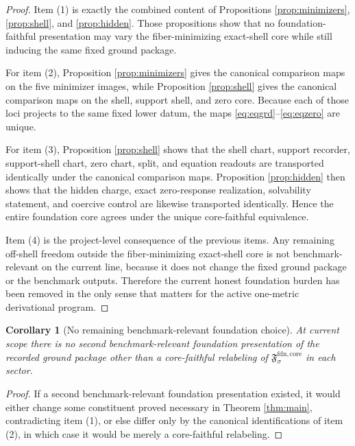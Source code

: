 \documentclass[11pt]{article}
\newcommand{\FoundCore}[1]{\mathfrak F_{#1}^{\mathrm{fdn,core}}}
\newtheorem{corollary}{Corollary}
\begin{document}
\begin{proof}
Item (1) is exactly the combined content of Propositions \ref{prop:minimizers}, \ref{prop:shell}, and \ref{prop:hidden}. Those propositions show that no foundation-faithful presentation may vary the fiber-minimizing exact-shell core while still inducing the same fixed ground package.

For item (2), Proposition \ref{prop:minimizers} gives the canonical comparison maps on the five minimizer images, while Proposition \ref{prop:shell} gives the canonical comparison maps on the shell, support shell, and zero core. Because each of those loci projects to the same fixed lower datum, the maps \eqref{eq:eqgrd}--\eqref{eq:eqzero} are unique.

For item (3), Proposition \ref{prop:shell} shows that the shell chart, support recorder, support-shell chart, zero chart, split, and equation readouts are transported identically under the canonical comparison maps. Proposition \ref{prop:hidden} then shows that the hidden charge, exact zero-response realization, solvability statement, and coercive control are likewise transported identically. Hence the entire foundation core agrees under the unique core-faithful equivalence.

Item (4) is the project-level consequence of the previous items. Any remaining off-shell freedom outside the fiber-minimizing exact-shell core is not benchmark-relevant on the current line, because it does not change the fixed ground package or the benchmark outputs. Therefore the current honest foundation burden has been removed in the only sense that matters for the active one-metric derivational program.
\end{proof}

\begin{corollary}[No remaining benchmark-relevant foundation choice]
\label{cor:nofreedom}
At current scope there is no second benchmark-relevant foundation presentation of the recorded ground package other than a core-faithful relabeling of \(\FoundCore{\sigma}\) in each sector.
\end{corollary}

\begin{proof}
If a second benchmark-relevant foundation presentation existed, it would either change some constituent proved necessary in Theorem \ref{thm:main}, contradicting item (1), or else differ only by the canonical identifications of item (2), in which case it would be merely a core-faithful relabeling.
\end{proof}
\end{document}
